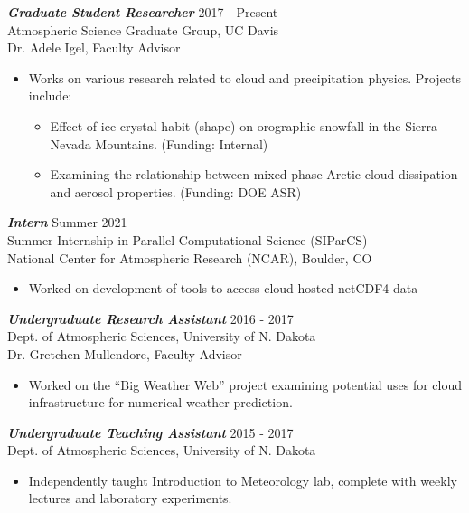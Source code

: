 \documentclass[overlapped]{res}
\begin{document}
\begin{resume}
                {\sl \textbf{Graduate Student Researcher}} \hfill 2017 - Present \\
                Atmospheric Science Graduate Group, UC Davis \\
                Dr. Adele Igel, Faculty Advisor \\
                \begin{itemize}
                    \item Works on various research related to cloud and precipitation physics. Projects include:
                    \begin{itemize} \itemsep -2pt
                        \item Effect of ice crystal habit (shape) on orographic snowfall in the Sierra Nevada Mountains. (Funding: Internal)
                        \item Examining the relationship between mixed-phase Arctic cloud dissipation and aerosol properties. (Funding: DOE ASR) 
                    \end{itemize}
                \end{itemize}

                {\sl \textbf{Intern}} \hfill Summer 2021 \\
                Summer Internship in Parallel Computational Science (SIParCS) \\
                National Center for Atmospheric Research (NCAR), Boulder, CO
                \begin{itemize}
                    \item Worked on development of tools to access cloud-hosted netCDF4 data 
                \end{itemize}

                {\sl \textbf{Undergraduate Research Assistant}} \hfill 2016 - 2017 \\
                Dept. of Atmospheric Sciences, University of N. Dakota \\
                Dr. Gretchen Mullendore, Faculty Advisor \\
                \begin{itemize}\itemsep -2pt
                    \item Worked on the “Big Weather Web” project examining potential uses for cloud infrastructure for numerical weather prediction.
                \end{itemize}

                {\sl \textbf{Undergraduate Teaching Assistant}} \hfill 2015 - 2017 \\
                Dept. of Atmospheric Sciences, University of N. Dakota \\
                \begin{itemize}\itemsep -2pt
                    \item Independently taught Introduction to Meteorology lab, complete with weekly lectures and laboratory experiments.
                    

\end{itemize}
\end{resume}
\end{document}
